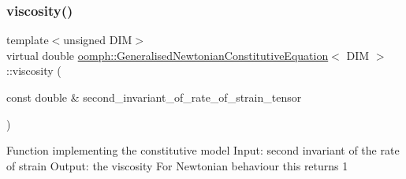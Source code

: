 \mbox{\label{classoomph_1_1GeneralisedNewtonianConstitutiveEquation_a3e6d811786e39ca3c3a9b1c46249442f}} 
\subsubsection{\texorpdfstring{viscosity()}{viscosity()}}
{\footnotesize\ttfamily template$<$unsigned D\+IM$>$ \\
virtual double \hyperlink{classoomph_1_1GeneralisedNewtonianConstitutiveEquation}{oomph\+::\+Generalised\+Newtonian\+Constitutive\+Equation}$<$ D\+IM $>$\+::viscosity (\begin{DoxyParamCaption}\item[{const double \&}]{second\+\_\+invariant\+\_\+of\+\_\+rate\+\_\+of\+\_\+strain\+\_\+tensor }\end{DoxyParamCaption})\hspace{0.3cm}{\ttfamily [pure virtual]}}

Function implementing the constitutive model Input\+: second invariant of the rate of strain Output\+: the viscosity For Newtonian behaviour this returns 1 

